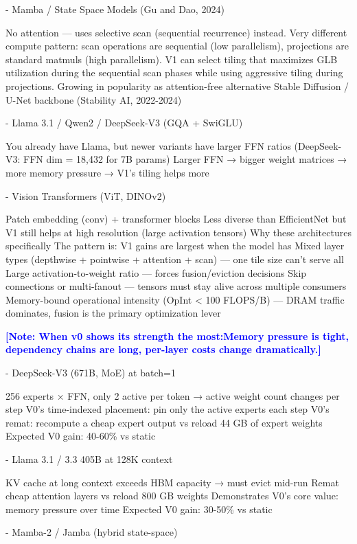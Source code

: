 \documentclass{article}
\renewcommand{\mnote}[1]{\textcolor{blue}{\textbf{[Note: #1]}}}
\begin{document}
- Mamba / State Space Models (Gu and Dao, 2024)

No attention — uses selective scan (sequential recurrence) instead. Very different compute pattern: scan operations are sequential (low parallelism), projections are standard matmuls (high parallelism). V1 can select tiling that maximizes GLB utilization during the sequential scan phases while using aggressive tiling during projections. Growing in popularity as attention-free alternative
Stable Diffusion / U-Net backbone (Stability AI, 2022-2024)

- Llama 3.1 / Qwen2 / DeepSeek-V3 (GQA + SwiGLU)

You already have Llama, but newer variants have larger FFN ratios (DeepSeek-V3: FFN dim = 18,432 for 7B params)
Larger FFN → bigger weight matrices → more memory pressure → V1's tiling helps more

- Vision Transformers (ViT, DINOv2)

Patch embedding (conv) + transformer blocks
Less diverse than EfficientNet but V1 still helps at high resolution (large activation tensors)
Why these architectures specifically
The pattern is: V1 gains are largest when the model has Mixed layer types (depthwise + pointwise + attention + scan) — one tile size can't serve all
Large activation-to-weight ratio — forces fusion/eviction decisions
Skip connections or multi-fanout — tensors must stay alive across multiple consumers
Memory-bound operational intensity (OpInt < 100 FLOPS/B) — DRAM traffic dominates, fusion is the primary optimization lever


\mnote{When v0 shows its strength the most:Memory pressure is tight, dependency chains are long, per-layer costs change dramatically.}

- DeepSeek-V3 (671B, MoE) at batch=1

256 experts × FFN, only 2 active per token → active weight count changes per step
V0's time-indexed placement: pin only the active experts each step
V0's remat: recompute a cheap expert output vs reload 44 GB of expert weights
Expected V0 gain: 40-60\% vs static


- Llama 3.1 / 3.3 405B at 128K context

KV cache at long context exceeds HBM capacity → must evict mid-run
Remat cheap attention layers vs reload 800 GB weights
Demonstrates V0's core value: memory pressure over time
Expected V0 gain: 30-50\% vs static


- Mamba-2 / Jamba (hybrid state-space)
\end{document}
